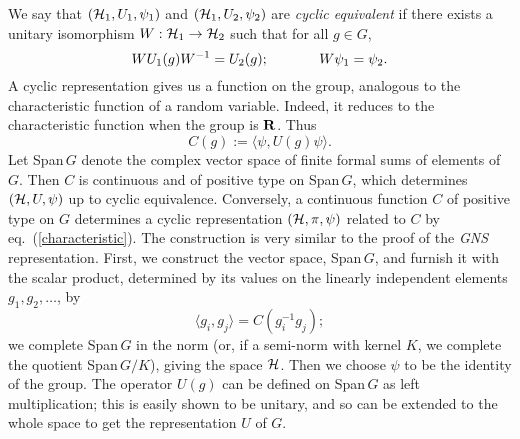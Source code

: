 We say that $({\cal H}_1,U_1,\psi_1)$ and $({\cal H}_1,U_2,\psi_2)$
are {\em cyclic equivalent} if there exists a unitary isomorphism
$W:{\cal H}_1\rightarrow{\cal H}_2$ such that for all $g\in G$,
\[WU_1(g)W^{-1}=U_2(g);\hspace{.5in}W\psi_1=\psi_2.\]
A cyclic representation gives us a function on the group, analogous to the
characteristic function of a random variable. Indeed, it reduces to
the characteristic function when the group is ${\bf R}$. Thus
\begin{equation}
C(g):=\langle\psi,U(g)\psi\rangle.
\label{characteristic}
\end{equation}
Let Span$\,G$ denote the complex vector space of finite formal sums of
elements of $G$. Then $C$ is continuous and of positive type on Span$\,G$,
which determines $({\cal H}, U,\psi)$ up to cyclic equivalence.
Conversely, a continuous function $C$ of positive type on $G$
determines a cyclic representation $({\cal H},\pi,\psi)$ related to $C$ by
eq.~(\ref{characteristic}). The construction is very similar to the proof
of the {\em GNS} representation. First, we construct the vector space,
Span$\,G$, and furnish it with the scalar product, determined by its values
on the linearly independent elements $g_1,g_2,\ldots$, by
\[\langle g_i,g_j\rangle=C(g_i^{-1}g_j);\]
we complete Span$\,G$ in the norm (or, if a semi-norm with kernel $K$,
we complete the quotient Span$\,G/K$), giving the space ${\cal H}$.
Then we choose $\psi$ to be
the identity of the group. The operator $U(g)$ can be defined on
Span$\,G$ as left multiplication; this is easily shown to be unitary,
and so can be extended to the whole space to get the representation $U$
of $G$.

